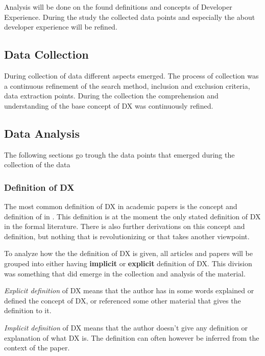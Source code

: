 \documentclass[english, 12pt, a4paper, sci, utf8, a-1b, online]{aaltothesis}
\begin{document}
Analysis will be done on the found definitions and concepts of Developer Experience. During the study the collected data points and especially the about developer experience will be refined.

\subsection{Data Collection}

During collection of data different aspects emerged. The process of collection was a continuous refinement of the search method, inclusion and exclusion criteria, data extraction points. During the collection the comprehension and understanding of the base concept of DX was continuously refined.

\subsection{Data Analysis}

The following sections go trough the data points that emerged during the collection of the data

\subsubsection{Definition of DX}

The most common definition of DX in academic papers is the concept and definition of in  \citep{fagerholm-dx-concept-and-definition}. This definition is at the moment the only stated definition of DX in the formal literature. There is also further derivations on this concept and definition, but nothing that is revolutionizing or that takes another viewpoint.

To analyze how the the definition of DX is given, all articles and papers will be grouped into either having \textbf{implicit} or \textbf{explicit} definition of DX. This division was something that did emerge in the collection and analysis of the material.

\textit{Explicit definition} of DX means that the author has in some words explained or defined the concept of DX, or referenced some other material that gives the definition to it.

\textit{Implicit definition} of DX means that the author doesn't give any definition or explanation of what DX is. The definition can often however be inferred from the context of the paper.
\end{document}
